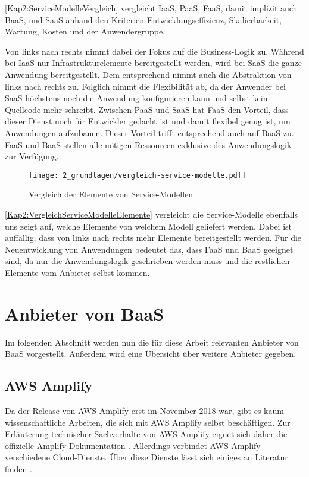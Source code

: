 \autoref{Kap2:ServiceModelleVergleich} vergleicht \ac{IaaS}, \ac{PaaS}, \ac{FaaS}, damit implizit auch \ac{BaaS}, und \ac{SaaS} anhand den Kriterien Entwicklungseffizienz, Skalierbarkeit, Wartung, Kosten und der Anwendergruppe.

Von links nach rechts nimmt dabei der Fokus auf die Business-Logik zu. Während bei \ac{IaaS} nur Infrastrukturelemente bereitgestellt werden, wird bei \ac{SaaS} die ganze Anwendung bereitgestellt. Dem entsprechend nimmt auch die Abstraktion von links nach rechts zu. Folglich nimmt die Flexibilität ab, da der Anwender bei \ac{SaaS} höchstens noch die Anwendung konfigurieren kann und selbst kein Quellcode mehr schreibt. Zwischen \ac{PaaS} und \ac{SaaS} hat \ac{FaaS} den Vorteil, dass dieser Dienst noch für Entwickler gedacht ist und damit flexibel genug ist, um Anwendungen aufzubauen. Dieser Vorteil trifft entsprechend auch auf \ac{BaaS} zu. \ac{FaaS} und \ac{BaaS} stellen alle nötigen Ressourcen exklusive des Anwendungslogik zur Verfügung.

\begin{figure}[h]
  \centering
  \texttt{[image: 2\_grundlagen/vergleich-service-modelle.pdf]}
  \caption{Vergleich der Elemente von Service-Modellen \autocite{jiang2020overview}}
  \label{Kap2:VergleichServiceModelleElemente}
\end{figure}

\autoref{Kap2:VergleichServiceModelleElemente} vergleicht die Service-Modelle ebenfalls uns zeigt auf, welche Elemente von welchem Modell geliefert werden. Dabei ist auffällig, dass von links nach rechts mehr Elemente bereitgestellt werden. Für die Neuentwicklung von Anwendungen bedeutet das, dass \ac{FaaS} und \ac{BaaS} geeignet sind, da nur die Anwendungslogik geschrieben werden muss und die restlichen Elemente vom Anbieter selbst kommen.

\section{Anbieter von \acl{BaaS}}

Im folgenden Abschnitt werden nun die für diese Arbeit relevanten Anbieter von \ac{BaaS} vorgestellt. Außerdem wird eine Übersicht über weitere Anbieter gegeben.

\subsection{\acs{AWS} Amplify}

Da der Release von \ac{AWS} Amplify erst im November 2018 war, gibt es kaum wissenschaftliche Arbeiten, die sich mit \ac{AWS} Amplify selbst beschäftigen. Zur Erläuterung technischer Sachverhalte von \ac{AWS} Amplify eignet sich daher die offizielle Amplify Dokumentation \autocite{amplifyDocs}. Allerdings verbindet \ac{AWS} Amplify verschiedene Cloud-Dienste. Über diese Dienste lässt sich einiges an Literatur finden  \autocite{dahunsi2021commercial}\autocite{lysakov2021security}\autocite{mathew2014overview}\autocite{beach2014aws}.

